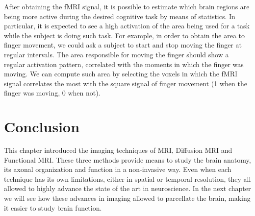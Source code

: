 After obtaining the fMRI signal, it is possible to estimate which brain regions
are being more active during the desired cognitive task by means of statistics.
In particular, it is expected to see a high activation of the area being used
for a task while the subject is doing such task. For example, in order to
obtain the area to finger movement, we could ask a subject to start and stop
moving the finger at regular intervals. The area responsible for moving the
finger should show a regular activation pattern, correlated with the moments
in which the finger was moving. We can compute such area by selecting the voxels
in which the fMRI signal correlates the most with the square signal of finger
movement (1 when the finger was moving, 0 when not).

\section{Conclusion}
This chapter introduced the imaging techniques of MRI, Diffusion MRI and
Functional MRI. These three methods provide means to study the brain anatomy,
its axonal organization and function in a non-invasive way. Even when each
technique has its own limitations, either in spatial or temporal resolution,
they all allowed to highly advance the state of the art in neuroscience. In
the next chapter we will see how these advances in imaging allowed to parcellate
the brain, making it easier to study brain function.

\chapterbib




%

